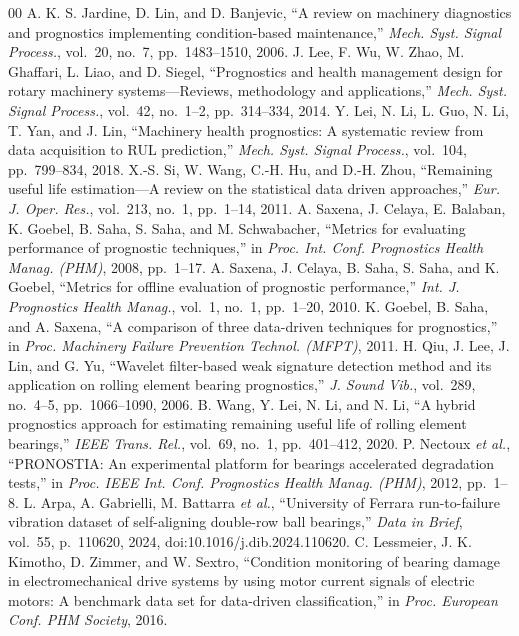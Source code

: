 \documentclass[journal]{IEEEtran}
\begin{document}
\begin{thebibliography}{00}
 A. K. S. Jardine, D. Lin, and D. Banjevic, ``A review on machinery diagnostics and prognostics implementing condition-based maintenance,'' \emph{Mech. Syst. Signal Process.}, vol.~20, no.~7, pp.~1483--1510, 2006.
 J. Lee, F. Wu, W. Zhao, M. Ghaffari, L. Liao, and D. Siegel, ``Prognostics and health management design for rotary machinery systems---Reviews, methodology and applications,'' \emph{Mech. Syst. Signal Process.}, vol.~42, no.~1--2, pp.~314--334, 2014.
 Y. Lei, N. Li, L. Guo, N. Li, T. Yan, and J. Lin, ``Machinery health prognostics: A systematic review from data acquisition to RUL prediction,'' \emph{Mech. Syst. Signal Process.}, vol.~104, pp.~799--834, 2018.
 X.-S. Si, W. Wang, C.-H. Hu, and D.-H. Zhou, ``Remaining useful life estimation---A review on the statistical data driven approaches,'' \emph{Eur. J. Oper. Res.}, vol.~213, no.~1, pp.~1--14, 2011.
 A. Saxena, J. Celaya, E. Balaban, K. Goebel, B. Saha, S. Saha, and M. Schwabacher, ``Metrics for evaluating performance of prognostic techniques,'' in \emph{Proc. Int. Conf. Prognostics Health Manag. (PHM)}, 2008, pp.~1--17.
 A. Saxena, J. Celaya, B. Saha, S. Saha, and K. Goebel, ``Metrics for offline evaluation of prognostic performance,'' \emph{Int. J. Prognostics Health Manag.}, vol.~1, no.~1, pp.~1--20, 2010.
 K. Goebel, B. Saha, and A. Saxena, ``A comparison of three data-driven techniques for prognostics,'' in \emph{Proc. Machinery Failure Prevention Technol. (MFPT)}, 2011.
 H. Qiu, J. Lee, J. Lin, and G. Yu, ``Wavelet filter-based weak signature detection method and its application on rolling element bearing prognostics,'' \emph{J. Sound Vib.}, vol.~289, no.~4--5, pp.~1066--1090, 2006.
 B. Wang, Y. Lei, N. Li, and N. Li, ``A hybrid prognostics approach for estimating remaining useful life of rolling element bearings,'' \emph{IEEE Trans. Rel.}, vol.~69, no.~1, pp.~401--412, 2020.
 P. Nectoux \emph{et al.}, ``PRONOSTIA: An experimental platform for bearings accelerated degradation tests,'' in \emph{Proc. IEEE Int. Conf. Prognostics Health Manag. (PHM)}, 2012, pp.~1--8.
 L. Arpa, A. Gabrielli, M. Battarra \emph{et al.}, ``University of Ferrara run-to-failure vibration dataset of self-aligning double-row ball bearings,'' \emph{Data in Brief}, vol.~55, p.~110620, 2024, doi:10.1016/j.dib.2024.110620.
 C. Lessmeier, J. K. Kimotho, D. Zimmer, and W. Sextro, ``Condition monitoring of bearing damage in electromechanical drive systems by using motor current signals of electric motors: A benchmark data set for data-driven classification,'' in \emph{Proc. European Conf. PHM Society}, 2016.

\end{thebibliography}
\end{document}
